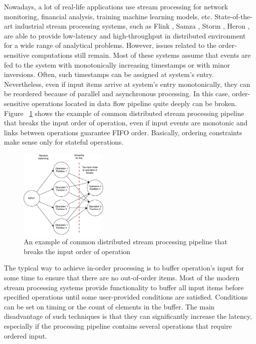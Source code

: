
\label {fs-intro}

Nowadays, a lot of real-life applications use stream processing for network monitoring, financial analysis, training machine learning models, etc. State-of-the-art industrial stream processing systems, such as Flink \cite{carbone2015apache}, Samza \cite{Noghabi:2017:SSS:3137765.3137770}, Storm \cite{apache:storm}, Heron \cite{Kulkarni:2015:THS:2723372.2742788}, are able to provide low-latency and high-throughput in distributed environment for a wide range of analytical problems. However, issues related to the order-sensitive computations still remain. Most of these systems assume that events are fed to the system with monotonically increasing timestamps or with minor inversions. Often, such timestamps can be assigned at system's entry. Nevertheless, even if input items arrive at system's entry monotonically, they can be reordered because of parallel and asynchronous processing. In this case, order-sensitive operations located in data flow pipeline quite deeply can be broken. Figure ~\ref{break-order-dataflow} shows the example of common distributed stream processing pipeline that breaks the input order of operation, even if input events are monotonic and links between operations guarantee FIFO order. Basically, ordering constraints make sense only for stateful operations.

\begin{figure}[htbp]
  \centering
  \includegraphics[width=0.38\textwidth]{pics/break_order_pipeline}
  \caption{An  example of common distributed stream processing pipeline that breaks the input order of operation}
  \label {break-order-dataflow}
\end{figure}

The typical way to achieve in-order processing is to buffer operation's input for some time to ensure that there are no out-of-order items. Most of the modern stream processing systems provide functionality to buffer all input items before specified operations until some user-provided conditions are satisfied. Conditions can be set on timing or the count of elements in the buffer. The main disadvantage of such techniques is that they  can  significantly increase the latency, especially if the processing pipeline contains several operations that require ordered input. 

